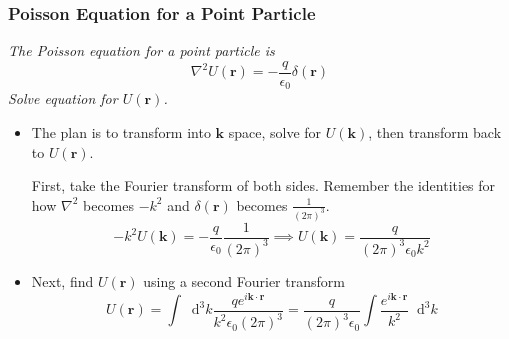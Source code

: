 \documentclass[11pt, a4paper]{article}
\newcommand{\diff}{\mathop{}\!\mathrm{d}} %
\renewcommand{\vec}[1]{\bm{#1}} %
\renewcommand{\r}{\vec{r}}
\begin{document}
\subsubsection{Poisson Equation for a Point Particle}
\textit{The Poisson equation for a point particle is}
\begin{equation*}
	\nabla^{2}U(\r) = - \frac{q}{\epsilon_{0}} \delta (\r)
\end{equation*}
\textit{Solve equation for $ U(\r) $.}
\begin{itemize}
	
	\item The plan is to transform into $ \vec{k} $ space, solve for $ U(\vec{k}) $, then transform back to $ U(\r) $. 
	
	First, take the Fourier transform of both sides. Remember the identities for how $ \nabla^{2} $ becomes $ -k^{2} $ and $ \delta(\r) $ becomes $ \frac{1}{(2\pi)^{3}} $.
	\begin{equation*}
		- k^{2}U(\vec{k}) = - \frac{q}{\epsilon_{0}} \frac{1}{(2\pi)^{3}} \implies U(\vec{k}) = \frac{q}{(2\pi)^{3} \epsilon_{0} k^{2}}
	\end{equation*}
	
	\item Next, find $ U(\r) $ using a second Fourier transform
	\begin{equation*}
		U(\r) = \int \diff^{3} k \frac{q e^{i\vec{k}\cdot \r}}{k^{2}\epsilon_{0}(2\pi)^{3}} = \frac{q}{(2\pi)^{3}\epsilon_{0}} \int \frac{e^{i\vec{k}\cdot \r}}{k^{2}} \diff^{3}k
	\end{equation*}
	

\end{itemize}
\end{document}
